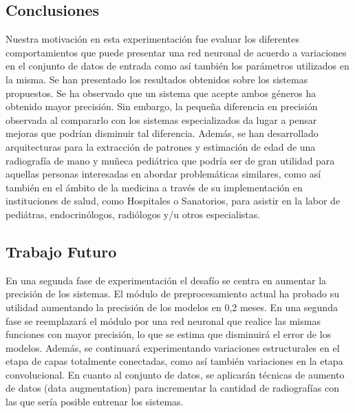 \documentclass[conference]{IEEEtran}
\begin{document}
\subsection{Conclusiones}
Nuestra motivación en esta experimentación fue evaluar los diferentes comportamientos que puede presentar una red neuronal de acuerdo a variaciones en el conjunto de datos de entrada como así también los parámetros utilizados en la misma. Se han presentado los resultados obtenidos sobre los sistemas propuestos. Se ha observado que un sistema que acepte ambos géneros ha obtenido mayor precisión. Sin embargo, la pequeña diferencia en precisión observada al compararlo con los sistemas especializados da lugar a pensar mejoras que podrían disminuir tal diferencia. Además, se han desarrollado arquitecturas para la extracción de patrones y estimación de edad de una radiografía de mano y muñeca pediátrica que podría ser de gran utilidad para aquellas personas interesadas en abordar problemáticas similares, como así también en el ámbito de la medicina a través de su implementación en instituciones de salud, como Hospitales o Sanatorios, para asistir en la labor de pediátras, endocrinólogos, radiólogos y/u otros especialistas. 


\subsection{Trabajo Futuro}
En una segunda fase de experimentación el desafío se centra en aumentar la precisión de los sistemas. El módulo de preprocesamiento actual ha probado su utilidad aumentando la precisión de los modelos en 0,2 meses. En una segunda fase se reemplazará el módulo por una red neuronal que realice las mismas funciones con mayor precisión, lo que se estima que disminuirá el error de los modelos. Además, se continuará experimentando variaciones estructurales en el etapa de capas totalmente conectadas, como así también variaciones en la etapa convolucional. En cuanto al conjunto de datos, se aplicarán técnicas de aumento de datos (data augmentation) para incrementar la cantidad de radiografías con las que sería posible entrenar los sistemas.
\end{document}
